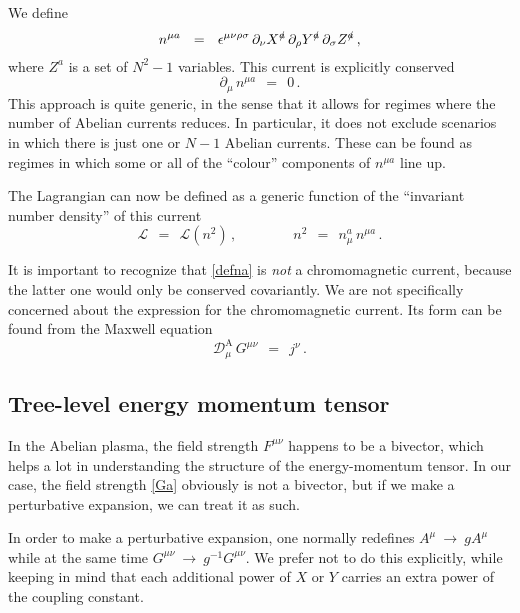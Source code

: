 \documentclass[epsfig,12pt]{article}
\def\beq{\begin{equation}}
\def\eeq{\end{equation}}
\newcommand{\p}{\partial}
\newcommand{\mc}[1]{\mathcal{#1}}
\newcommand{\md}{\mathcal{D}}
\begin{document}
	We define
\beq
\label{defna}
	n^{\mu a}    ~~=~~    \epsilon^{\mu\nu\rho\sigma}\, \p_\nu X^\slashed{a}\, \p_\rho Y^\slashed{a}\, \p_\sigma Z^\slashed{a}\,,
\eeq
	where $ Z^a $ is a set of $ N^2 - 1 $ variables.
	This current is explicitly conserved
\beq
\label{ncont}
	\p_\mu\, n^{\mu a}    ~~=~~    0\,.
\eeq
	This approach is quite generic, in the sense that it allows for regimes where the number of Abelian
	currents reduces.
	In particular, it does not exclude scenarios in which there is just one or $ N - 1 $ Abelian currents.
	These can be found as regimes in which some or all of the ``colour'' components of $ n^{\mu a} $ line up.

	The Lagrangian can now be defined as a generic function of the ``invariant number density'' of this current
\beq
	\mc{L}    ~~=~~    \mc{L}(n^2)\,,
        \qquad\qquad
        n^2 ~~=~~ n_\mu^a\, n^{\mu a}\,.
\eeq

	It is important to recognize that \eqref{defna} is \emph{not} a chromomagnetic current,
        because the latter one would only be conserved covariantly.
	We are not specifically concerned about the expression for the chromomagnetic current.
	Its form can be found from the Maxwell equation
\beq
	\md^\text{A}_\mu\, G^{\mu\nu}     ~~=~~    j^\nu\,.
\eeq




\subsection{Tree-level energy momentum tensor}
	In the Abelian plasma, the field strength $ F^{\mu\nu} $ happens to be a bivector,
	which helps a lot in understanding the structure of the energy-momentum tensor.
	In our case, the field strength \eqref{Ga} obviously is not a bivector, but
	if we make a perturbative expansion, we can treat it as such.
	
	In order to make a perturbative expansion, one normally redefines $ A^\mu ~\to~ g A^\mu $
	while at the same time $ G^{\mu\nu} ~\to~ g^{-1} G^{\mu\nu} $.
	We prefer not to do this explicitly, while keeping in mind that each additional power of $ X $ or $ Y $
	carries an extra power of the coupling constant.
\end{document}
